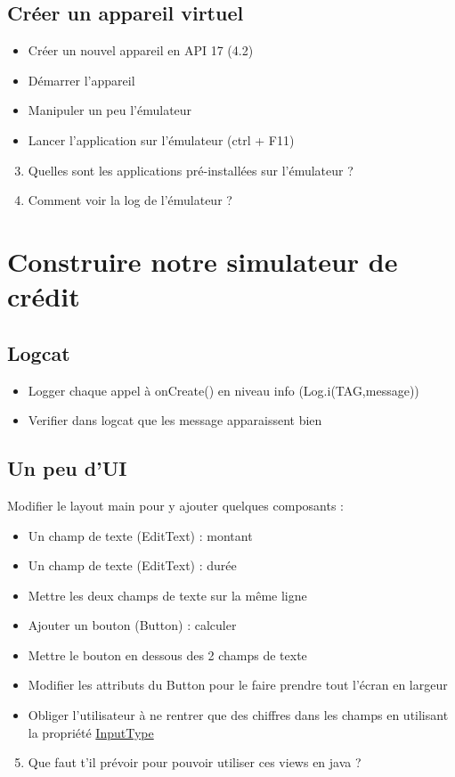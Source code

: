 \documentclass{article}
\begin{document}
\subsection{Créer un appareil virtuel}
\begin{itemize}
\item Créer un nouvel appareil en API 17 (4.2)
\item Démarrer l'appareil
\item Manipuler un peu l'émulateur
\item Lancer l'application sur l'émulateur (ctrl + F11)
\end{itemize}
\begin{enumerate}
 \setcounter{enumi}{2}
\item Quelles sont les applications pré-installées sur l'émulateur ?
\item Comment voir la log de l'émulateur ?
\end{enumerate}
\newpage
\section{Construire notre simulateur de crédit}
\subsection{Logcat}
\begin{itemize}
\item Logger chaque appel à onCreate() en niveau info (Log.i(TAG,message))
\item Verifier dans logcat que les message apparaissent bien
\end{itemize}
\subsection{Un peu d'UI}
Modifier le layout main pour y ajouter quelques composants :
\begin{itemize}
\item Un champ de texte (EditText) : montant
\item Un champ de texte (EditText) : durée
\item Mettre les deux champs de texte sur la même ligne
\item Ajouter un bouton (Button) : calculer
\item Mettre le bouton en dessous des 2 champs de texte
\item Modifier les attributs du Button pour le faire prendre tout l'écran en largeur
\item Obliger l'utilisateur à ne rentrer que des chiffres dans les champs en utilisant la propriété \href{http://developer.android.com/reference/android/widget/TextView.html#attr_android:inputType}{InputType}
\end{itemize}
\begin{enumerate}
 \setcounter{enumi}{4}
\item Que faut t'il prévoir pour pouvoir utiliser ces views en java ?
\end{enumerate}
\end{document}
